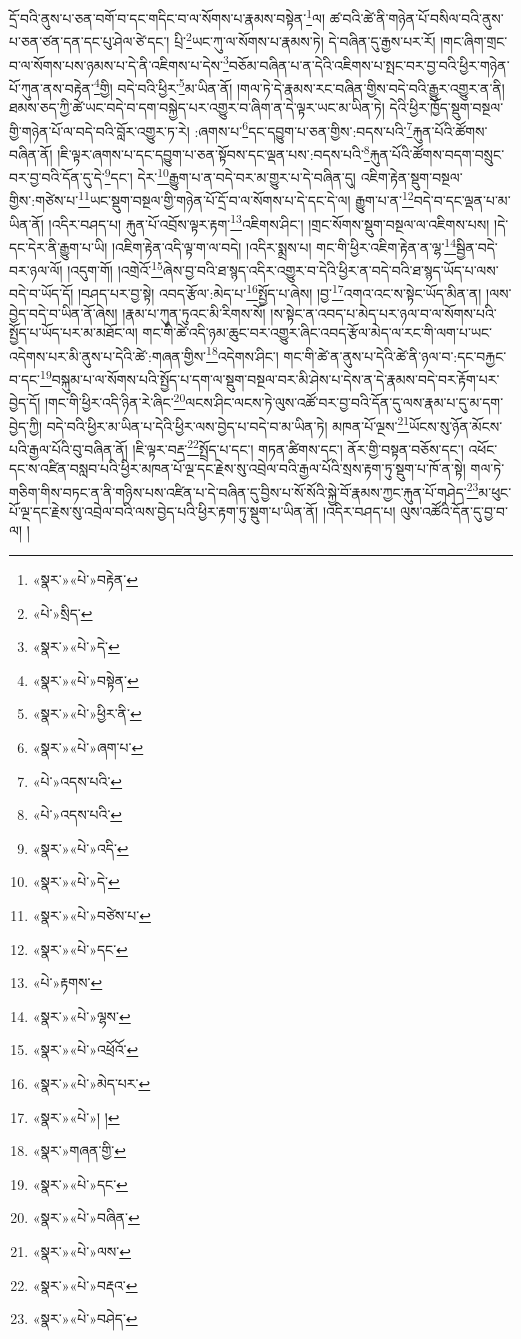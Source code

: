 དྲོ་བའི་ནུས་པ་ཅན་བགོ་བ་དང་གདིང་བ་ལ་སོགས་པ་རྣམས་བསྟེན་\footnote{«སྣར་»«པེ་»བརྟེན་}ལ། ཚ་བའི་ཚེ་ནི་གཉེན་པོ་བསིལ་བའི་ནུས་པ་ཅན་ཙན་དན་དང་པུ་ཤེལ་ཙེ་དང་། པྲི་\footnote{«པེ་»སྲིད་}ཡང་ཀུ་ལ་སོགས་པ་རྣམས་ཏེ། དེ་བཞིན་དུ་རྒྱས་པར་རོ། །གང་ཞིག་གྲང་བ་ལ་སོགས་པས་ཉམས་པ་དེ་ནི་འཇིགས་པ་དེས་\footnote{«སྣར་»«པེ་»དེ་}བཅོམ་བཞིན་པ་ན་དེའི་འཇིགས་པ་སྤང་བར་བྱ་བའི་ཕྱིར་གཉེན་པོ་ཀུན་ནས་བརྟེན་\footnote{«སྣར་»«པེ་»བསྟེན་}གྱི། བདེ་བའི་ཕྱིར་\footnote{«སྣར་»«པེ་»ཕྱིར་ནི་}མ་ཡིན་ནོ། །གལ་ཏེ་དེ་རྣམས་རང་བཞིན་གྱིས་བདེ་བའི་རྒྱུར་འགྱུར་ན་ནི། ཐམས་ཅད་ཀྱི་ཚེ་ཡང་བདེ་བ་དག་བསྐྱེད་པར་འགྱུར་བ་ཞིག་ན་དེ་ལྟར་ཡང་མ་ཡིན་ཏེ། དེའི་ཕྱིར་ཁྱོད་སྡུག་བསྔལ་གྱི་གཉེན་པོ་ལ་བདེ་བའི་བློར་འགྱུར་ཏ་རེ། :ཞགས་པ་\footnote{«སྣར་»«པེ་»ཞག་པ་}དང་དབྱུག་པ་ཅན་གྱིས་:བདས་པའི་\footnote{«པེ་»འདས་པའི་}རྐུན་པོའི་ཚོགས་བཞིན་ནོ། །ཇི་ལྟར་ཞགས་པ་དང་དབྱུག་པ་ཅན་སྟོབས་དང་ལྡན་པས་:བདས་པའི་\footnote{«པེ་»འདས་པའི་}རྐུན་པོའི་ཚོགས་བདག་བསྲུང་བར་བྱ་བའི་དོན་དུ་དེ་\footnote{«སྣར་»«པེ་»འདི་}དང་། དེར་\footnote{«སྣར་»«པེ་»དེ་}རྒྱུག་པ་ན་བདེ་བར་མ་གྱུར་པ་དེ་བཞིན་དུ། འཇིག་རྟེན་སྡུག་བསྔལ་གྱིས་:གཙེས་པ་\footnote{«སྣར་»«པེ་»བཙེས་པ་}ཡང་སྡུག་བསྔལ་གྱི་གཉེན་པོ་དྲོ་བ་ལ་སོགས་པ་དེ་དང་དེ་ལ། རྒྱུག་པ་ན་\footnote{«སྣར་»«པེ་»དང་}བདེ་བ་དང་ལྡན་པ་མ་ཡིན་ནོ། །འདིར་བཤད་པ། རྐུན་པོ་འབྲོས་ལྟར་རྟག་\footnote{«པེ་»རྟགས་}འཇིགས་ཤིང་། །གྲང་སོགས་སྡུག་བསྔལ་ལ་འཇིགས་པས། །དེ་དང་དེར་ནི་རྒྱུག་པ་ཡི། །འཇིག་རྟེན་འདི་ལྟ་ག་ལ་བདེ། །འདིར་སྨྲས་པ། གང་གི་ཕྱིར་འཇིག་རྟེན་ན་ལྷ་\footnote{«སྣར་»«པེ་»ལྷས་}སྦྱིན་བདེ་བར་ཉལ་ལོ། །འདུག་གོ། །འགྲེའོ་\footnote{«སྣར་»«པེ་»འཕྲོའོ་}ཞེས་བྱ་བའི་ཐ་སྙད་འདིར་འགྱུར་བ་དེའི་ཕྱིར་ན་བདེ་བའི་ཐ་སྙད་ཡོད་པ་ལས་བདེ་བ་ཡོད་དོ། །བཤད་པར་བྱ་སྟེ། འབད་རྩོལ་:མེད་པ་\footnote{«སྣར་»«པེ་»མེད་པར་}སྤྱོད་པ་ཞེས། །བྱ་\footnote{«སྣར་»«པེ་»། །}འགའ་འང་ས་སྟེང་ཡོད་མིན་ན། །ལས་བྱེད་བདེ་བ་ཡིན་ནོ་ཞེས། །རྣམ་པ་ཀུན་ཏུའང་མི་རིགས་སོ། །ས་སྟེང་ན་འབད་པ་མེད་པར་ཉལ་བ་ལ་སོགས་པའི་སྤྱོད་པ་ཡོད་པར་མ་མཐོང་ལ། གང་གི་ཚེ་འདི་ཉམ་ཆུང་བར་འགྱུར་ཞིང་འབད་རྩོལ་མེད་ལ་རང་གི་ལག་པ་ཡང་འདེགས་པར་མི་ནུས་པ་དེའི་ཚེ་:གཞན་གྱིས་\footnote{«སྣར་»གཞན་གྱི་}འདེགས་ཤིང་། གང་གི་ཚེ་ན་ནུས་པ་དེའི་ཚེ་ནི་ཉལ་བ་:དང་བརྐྱང་བ་དང་\footnote{«སྣར་»«པེ་»དང་}བསྐུམ་པ་ལ་སོགས་པའི་སྤྱོད་པ་དག་ལ་སྡུག་བསྔལ་བར་མི་ཤེས་པ་དེས་ན་དེ་རྣམས་བདེ་བར་རྟོག་པར་བྱེད་དོ། །གང་གི་ཕྱིར་འདི་ཉིན་རེ་ཞིང་\footnote{«སྣར་»«པེ་»བཞིན་}ལངས་ཤིང་ལངས་ཏེ་ལུས་འཚོ་བར་བྱ་བའི་དོན་དུ་ལས་རྣམ་པ་དུ་མ་དག་བྱེད་ཀྱི། བདེ་བའི་ཕྱིར་མ་ཡིན་པ་དེའི་ཕྱིར་ལས་བྱེད་པ་བདེ་བ་མ་ཡིན་ཏེ། མཁན་པོ་ལྔས་\footnote{«སྣར་»«པེ་»ལས་}ཡོངས་སུ་ཉོན་མོངས་པའི་རྒྱལ་པོའི་བུ་བཞིན་ནོ། །ཇི་ལྟར་བརྡ་\footnote{«སྣར་»«པེ་»བརྡའ་}སྤྲོད་པ་དང་། གཏན་ཚིགས་དང་། ནོར་གྱི་བསྟན་བཅོས་དང་། འཕོང་དང་ས་འཛིན་བསླབ་པའི་ཕྱིར་མཁན་པོ་ལྔ་དང་རྗེས་སུ་འབྲེལ་བའི་རྒྱལ་པོའི་སྲས་རྟག་ཏུ་སྡུག་པ་ཁོ་ན་སྟེ། གལ་ཏེ་གཅིག་གིས་བཏང་ན་ནི་གཉིས་པས་འཛིན་པ་དེ་བཞིན་དུ་བྱིས་པ་སོ་སོའི་སྐྱེ་བོ་རྣམས་ཀྱང་རྐུན་པོ་གཤེད་\footnote{«སྣར་»«པེ་»བཤེད་}མ་ཕུང་པོ་ལྔ་དང་རྗེས་སུ་འབྲེལ་བའི་ལས་བྱེད་པའི་ཕྱིར་རྟག་ཏུ་སྡུག་པ་ཡིན་ནོ། །འདིར་བཤད་པ། ལུས་འཚོའི་དོན་དུ་བྱ་བ་ལ། །

